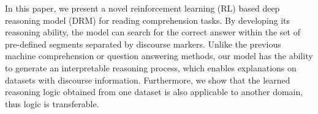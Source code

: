 In this paper, we present a novel reinforcement learning (RL) based deep reasoning model (DRM) for reading comprehension tasks. By developing its reasoning ability, the model can search for the correct answer within the set of pre-defined segments separated by discourse markers. Unlike the previous machine comprehension or question answering methods, our model has the ability to generate an interpretable reasoning process, which enables explanations on datasets with  discourse information. Furthermore, we show that the learned reasoning logic obtained from one dataset is also applicable to another domain, thus logic is transferable. 
